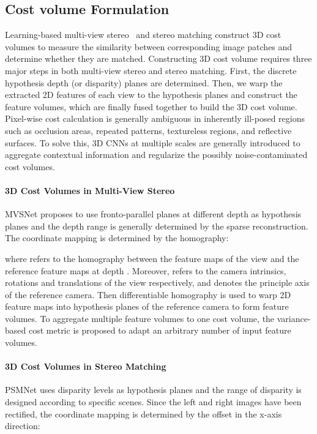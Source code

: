 \documentclass[10pt,twocolumn,letterpaper]{article}
\begin{document}
\subsection{Cost volume Formulation}
Learning-based multi-view stereo~\cite{yao2018mvsnet,yao2019recurrent,chen2019point} and stereo matching \cite{chang2018pyramid,kendall2017end,zbontar2015computing,zhang2019ga,guo2019group} construct 3D cost volumes to measure the similarity between corresponding image patches and determine whether they are matched.
Constructing 3D cost volume requires three major steps in both multi-view stereo and stereo matching.
First, the discrete hypothesis depth (or disparity) planes are determined.
Then, we warp the extracted 2D features of each view to the hypothesis planes and construct the feature volumes, which are finally fused together to build the 3D cost volume.
Pixel-wise cost calculation is generally ambiguous in inherently ill-posed regions such as occlusion areas, repeated patterns, textureless regions, and reflective surfaces.
To solve this, 3D CNNs at multiple scales are generally introduced to aggregate contextual information and regularize the possibly noise-contaminated cost volumes.

\vspace{-4mm}
\paragraph{3D Cost Volumes in Multi-View Stereo}
MVSNet \cite{yao2018mvsnet} proposes to use fronto-parallel planes at different depth as hypothesis planes and the depth range is generally determined by the sparse reconstruction.
The coordinate mapping is determined by the homography:

where  refers to the homography between the feature maps of the  view and the reference feature maps at depth .
Moreover,  refers to the camera intrinsics, rotations and translations of the  view respectively, and  denotes the principle axis of the reference camera.
Then differentiable homography is used to warp 2D feature maps into hypothesis planes of the reference camera to form feature volumes.
To aggregate multiple feature volumes to one cost volume, the variance-based cost metric is proposed to adapt an arbitrary number of input feature volumes.


\paragraph{3D Cost Volumes in Stereo Matching}\vspace{-3mm}
PSMNet \cite{chang2018pyramid} uses disparity levels as hypothesis planes and the range of disparity is designed according to specific scenes.
Since the left and right images have been rectified, the coordinate mapping is determined by the offset in the x-axis direction:
\end{document}
